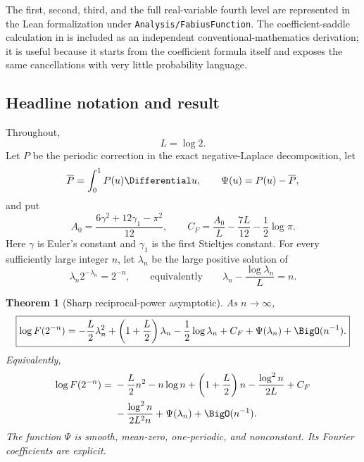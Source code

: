 \documentclass[11pt,oneside]{article}
\newtheorem{theorem}{Theorem}[section]
\theoremstyle{definition}
\theoremstyle{remark}
\newcommand{\repo}{\nolinkurl{Analysis/FabiusFunction}}
\begin{document}
The first, second, third, and the full real-variable fourth level are represented in the Lean
formalization under \repo.  The coefficient-saddle calculation in 
is included as an independent conventional-mathematics derivation; it is useful because it
starts from the coefficient formula itself and exposes the same cancellations with very
little probability language.

\subsection{Headline notation and result}

Throughout,
\begin{equation}
 L=\log2.                                                     \label{dyadicasym:eq:L}
\end{equation}
Let $P$ be the periodic correction in the exact negative-Laplace decomposition, let
\begin{equation}
 \overline P=\int_0^1P(u)\Differential u,
 \qquad \Psi(u)=P(u)-\overline P,                            \label{dyadicasym:eq:Psi-intro}
\end{equation}
and put
\begin{equation}
 A_0=\frac{6\gamma^2+12\gamma_1-\pi^2}{12},
 \qquad
 C_F=\frac{A_0}{L}-\frac{7L}{12}-\frac12\log\pi.            \label{dyadicasym:eq:CF-intro}
\end{equation}
Here $\gamma$ is Euler's constant and $\gamma_1$ is the first Stieltjes constant.
For every sufficiently large integer $n$, let $\lambda_n$ be the large positive solution of
\begin{equation}
 \lambda_n2^{-\lambda_n}=2^{-n},
 \qquad\text{equivalently}\qquad
 \lambda_n-\frac{\log\lambda_n}{L}=n.                       \label{dyadicasym:eq:lambda-n-intro}
\end{equation}

\begin{theorem}[Sharp reciprocal-power asymptotic]
\label{dyadicasym:thm:headline}
As $n\to\infty$,
\begin{equation}
 \boxed{
 \log F(2^{-n})=
 -\frac L2\lambda_n^2+
 \left(1+\frac L2\right)\lambda_n-\frac12\log\lambda_n
 +C_F+\Psi(\lambda_n)+\BigO(n^{-1}).}                       \label{dyadicasym:eq:headline-compact}
\end{equation}
Equivalently,
\begin{align}
 \log F(2^{-n})={}&-\frac L2n^2-n\log n+
 \left(1+\frac L2\right)n-\frac{\log^2n}{2L}+C_F           \notag\\
 &-\frac{\log^2n}{2L^2n}+\Psi(\lambda_n)+\BigO(n^{-1}).   \label{dyadicasym:eq:headline-expanded}
\end{align}
The function $\Psi$ is smooth, mean-zero, one-periodic, and nonconstant.  Its Fourier
coefficients are explicit.
\end{theorem}
\end{document}
